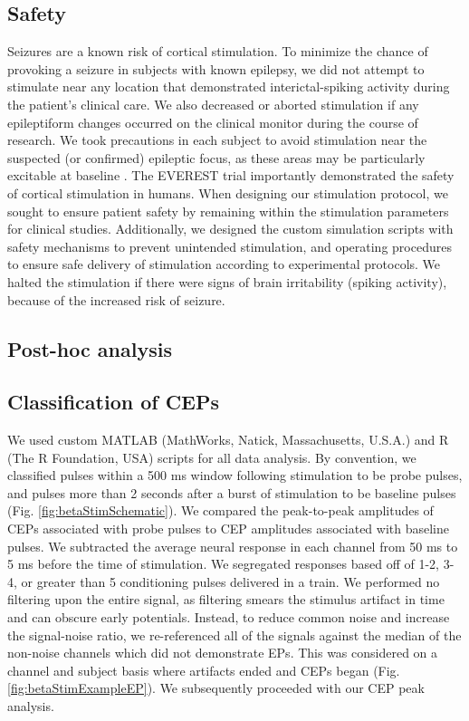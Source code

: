 \subsection{Safety}
Seizures are a known risk of cortical stimulation. To minimize the chance of provoking a seizure in subjects with known epilepsy, we did not attempt to stimulate near any location that demonstrated interictal-spiking activity during the patient’s clinical care. We also decreased or aborted stimulation if any epileptiform changes occurred on the clinical monitor during the course of research. We took precautions in each subject to avoid stimulation near the suspected (or confirmed) epileptic focus, as these areas may be particularly excitable at baseline \cite{Iwasaki2010,Enatsu2012}. The EVEREST trial importantly demonstrated the safety of cortical stimulation in humans. When designing our stimulation protocol, we sought to ensure patient safety by remaining within the stimulation parameters for clinical studies. Additionally, we designed the custom simulation scripts with safety mechanisms to prevent unintended stimulation, and operating procedures to ensure safe delivery of stimulation according to experimental protocols. We halted the stimulation if there were signs of brain irritability (spiking activity), because of the increased risk of seizure. 

\subsection{Post-hoc analysis}
\subsection{Classification of CEPs}
We used custom MATLAB (MathWorks, Natick, Massachusetts, U.S.A.) and R (The R Foundation, USA) scripts for all data analysis. By convention, we classified pulses within a 500 ms window following stimulation to be probe pulses, and pulses more than 2 seconds after a burst of stimulation to be baseline pulses (Fig. \ref{fig:betaStimSchematic}). We compared the peak-to-peak amplitudes of CEPs associated with probe pulses to CEP amplitudes associated with baseline pulses. We subtracted the average neural response in each channel from 50 ms to 5 ms before the time of stimulation.  We segregated responses based off of 1-2, 3-4, or greater than 5 conditioning pulses delivered in a train. We performed no filtering upon the entire signal, as filtering smears the stimulus artifact in time and can obscure early potentials. Instead, to reduce common noise and increase the signal-noise ratio, we re-referenced all of the signals against the median of the non-noise channels which did not demonstrate EPs. This was considered on a channel and subject basis where artifacts ended and CEPs began (Fig. \ref{fig:betaStimExampleEP}).  We subsequently proceeded with our CEP peak analysis. 



